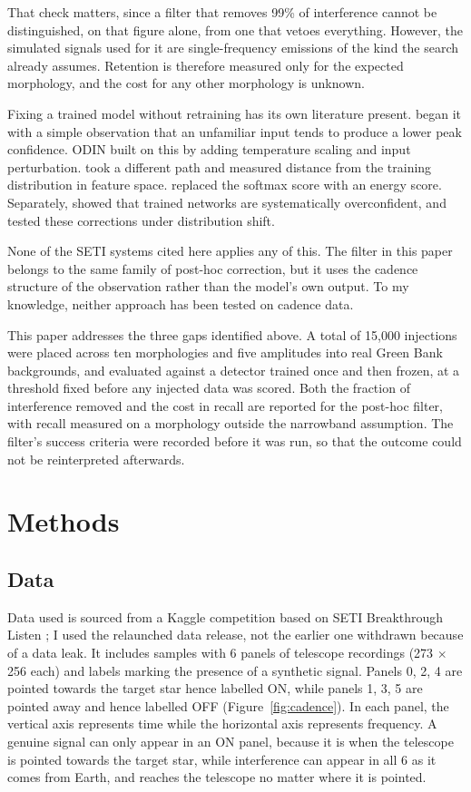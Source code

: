 \documentclass[11pt]{article}
\begin{document}
That check matters, since a filter that removes 99\% of interference cannot be distinguished, on that figure alone, from one that vetoes everything. However, the simulated signals used for it are single-frequency emissions of the kind the search already assumes. Retention is therefore measured only for the expected morphology, and the cost for any other morphology is unknown.

Fixing a trained model without retraining has its own literature present. \citet{hendrycks2017} began it with a simple observation that an unfamiliar input tends to produce a lower peak confidence. ODIN \citep{liang2018} built on this by adding temperature scaling and input perturbation. \citet{lee2018} took a different path and measured distance from the training distribution in feature space. \citet{liu2020} replaced the softmax score with an energy score. Separately, \citet{guo2017} showed that trained networks are systematically overconfident, and \citet{ovadia2019} tested these corrections under distribution shift.

None of the SETI systems cited here applies any of this. The filter in this paper belongs to the same family of post-hoc correction, but it uses the cadence structure of the observation rather than the model's own output. To my knowledge, neither approach has been tested on cadence data.

This paper addresses the three gaps identified above. A total of 15,000 injections were placed across ten morphologies and five amplitudes into real Green Bank backgrounds, and evaluated against a detector trained once and then frozen, at a threshold fixed before any injected data was scored. Both the fraction of interference removed and the cost in recall are reported for the post-hoc filter, with recall measured on a morphology outside the narrowband assumption. The filter's success criteria were recorded before it was run, so that the outcome could not be reinterpreted afterwards.

\section{Methods}
\subsection{Data}
Data used is sourced from a Kaggle competition based on SETI Breakthrough Listen \citep{bl2021}; I used the relaunched data release, not the earlier one withdrawn because of a data leak. It includes samples with 6 panels of telescope recordings (273 $\times$ 256 each) and labels marking the presence of a synthetic signal. Panels 0, 2, 4 are pointed towards the target star hence labelled ON, while panels 1, 3, 5 are pointed away and hence labelled OFF (Figure~\ref{fig:cadence}). In each panel, the vertical axis represents time while the horizontal axis represents frequency. A genuine signal can only appear in an ON panel, because it is when the telescope is pointed towards the target star, while interference can appear in all 6 as it comes from Earth, and reaches the telescope no matter where it is pointed.
\end{document}
